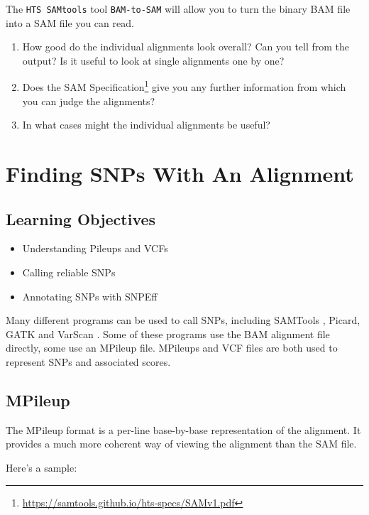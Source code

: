 \documentclass[12pt,]{book}
\providecommand{\tightlist}{%
  \setlength{\itemsep}{0pt}\setlength{\parskip}{0pt}}
\let\rmarkdownfootnote\footnote%
\def\footnote{\protect\rmarkdownfootnote}
\renewcommand{\href}[2]{#2\footnote{\url{#1}}}
\begin{document}
The \texttt{HTS\ SAMtools} tool \texttt{BAM-to-SAM} will allow you to
turn the binary BAM file into a SAM file you can read.

\begin{enumerate}
\def\labelenumi{\arabic{enumi}.}
\tightlist
\item
  How good do the individual alignments look overall? Can you tell from
  the output? Is it useful to look at single alignments one by one?
\item
  Does the \href{https://samtools.github.io/hts-specs/SAMv1.pdf}{SAM
  Specification} give you any further information from which you can
  judge the alignments?
\item
  In what cases might the individual alignments be useful?
\end{enumerate}

\chapter{Finding SNPs With An
Alignment}\label{finding-snps-with-an-alignment}

\section{Learning Objectives}\label{learning-objectives-3}

\begin{itemize}
\tightlist
\item
  Understanding Pileups and VCFs
\item
  Calling reliable SNPs
\item
  Annotating SNPs with SNPEff
\end{itemize}

Many different programs can be used to call SNPs, including SAMTools
\citep{Li:2009ka}, Picard, GATK \citep{DeSumma:2017kr} and VarScan
\citep{Koboldt:2009dk}. Some of these programs use the BAM alignment
file directly, some use an MPileup file. MPileups and VCF files are both
used to represent SNPs and associated scores.

\section{MPileup}\label{mpileup}

The MPileup format is a per-line base-by-base representation of the
alignment. It provides a much more coherent way of viewing the alignment
than the SAM file.

Here's a sample:
\end{document}
